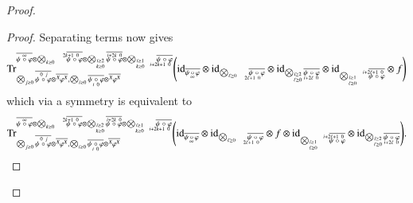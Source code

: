 \documentclass{amsart}
\def\tn{\textnormal}
\def\Trace{\tn{Tr}}
\def\ol{\overline}
\def\id{\tn{id}}
\newcommand{\feeddd}[3]{{\tensor*[^{#2}_{\color{white}{!}}]{{#1}}{^{#3}}}}%
\theoremstyle{remark}
\theoremstyle{definition}
\begin{document}
\begin{proof}
\begin{proof}
Separating terms now gives
 \begin{align*}
  \Trace^{\ol{\psi\;\accentset{\infty}{\circ}\;\varphi}\otimes\bigotimes_{k\ge0}\quad\ol{\psi\;\accentset{2k+1\ 0\ \ \ }{\circ}\;\varphi}\otimes\bigotimes_{\substack{\scriptscriptstyle i\ge2\\ \scriptscriptstyle k\ge0}}\ol{\psi\;\accentset{i+2k\ 0}{\circ}\;\varphi}\otimes\bigotimes_{\substack{\scriptscriptstyle i\ge1\\ \scriptscriptstyle k\ge0}}\quad\ol{\psi\;\underaccent{i+2k+1\ 0\ \ \ }{\circ}\;\varphi}}_{\bigotimes_{j\ge0}\ol{\psi\;\accentset{\,0\ j}{\circ}\;\varphi}\otimes\ol{\feeddd{\varphi}{X}{X}},\bigotimes_{i\ge0}\ol{\psi\;\underaccent{\,i\ 0}{\circ}\;\varphi}\otimes\ol{\feeddd{\varphi}{X}{X}}}
\Bigg(\id_{\ol{\psi\,\underaccent{\,\infty}{\circ}\,\varphi}}\otimes\id_{\bigotimes_{\ell\ge0}\quad\ol{\psi\;\underaccent{2\ell+1\ 0\ \ \ }{\circ}\;\varphi}}\otimes \id_{\bigotimes_{\substack{\scriptscriptstyle i\ge2\\ \scriptscriptstyle \ell\ge0}}\ol{\psi\;\underaccent{i+2\ell\ 0}{\circ}\;\varphi}}\otimes \id_{\bigotimes_{\substack{\scriptscriptstyle i\ge1\\ \scriptscriptstyle \ell\ge0}}\quad\ol{\psi\;\accentset{i+2\ell+1\ 0\ \ \ }{\circ}\;\varphi}}\otimes f\Bigg)
\end{align*}
which via a symmetry is equivalent to
 \begin{align*}
  \Trace^{\ol{\psi\;\accentset{\infty}{\circ}\;\varphi}\otimes\bigotimes_{k\ge0}\quad\ol{\psi\;\accentset{2k+1\ 0\ \ \ }{\circ}\;\varphi}\otimes\bigotimes_{\substack{\scriptscriptstyle i\ge2\\ \scriptscriptstyle k\ge0}}\ol{\psi\;\accentset{i+2k\ 0}{\circ}\;\varphi}\otimes\bigotimes_{\substack{\scriptscriptstyle i\ge1\\ \scriptscriptstyle k\ge0}}\quad\ol{\psi\;\underaccent{i+2k+1\ 0\ \ \ }{\circ}\;\varphi}}_{\bigotimes_{j\ge0}\ol{\psi\;\accentset{\,0\ j}{\circ}\;\varphi}\otimes\ol{\feeddd{\varphi}{X}{X}},\bigotimes_{i\ge0}\ol{\psi\;\underaccent{\,i\ 0}{\circ}\;\varphi}\otimes\ol{\feeddd{\varphi}{X}{X}}}
\Bigg(\id_{\ol{\psi\,\underaccent{\,\infty}{\circ}\,\varphi}}\otimes\id_{\bigotimes_{\ell\ge0}\quad\ol{\psi\;\underaccent{2\ell+1\ 0\ \ \ }{\circ}\;\varphi}}\otimes f\otimes \id_{\bigotimes_{\substack{\scriptscriptstyle i\ge1\\ \scriptscriptstyle \ell\ge0}}\quad\ol{\psi\;\accentset{i+2\ell+1\ 0\ \ \ }{\circ}\;\varphi}}\otimes \id_{\bigotimes_{\substack{\scriptscriptstyle i\ge2\\ \scriptscriptstyle \ell\ge0}}\ol{\psi\;\underaccent{i+2\ell\ 0}{\circ}\;\varphi}}\Bigg).
\end{align*}


\end{proof}
\end{proof}
\end{document}
